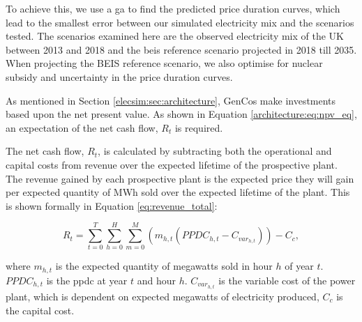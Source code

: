 To achieve this, we use a \acrfull{ga} to find the predicted price duration curves, which lead to the smallest error between our simulated electricity mix and the scenarios tested. The scenarios examined here are the observed electricity mix of the UK between 2013 and 2018 and the \acrfull{beis} reference scenario projected in 2018 till 2035. When projecting the BEIS reference scenario, we also optimise for nuclear subsidy and uncertainty in the price duration curves.






As mentioned in Section \ref{elecsim:sec:architecture}, GenCos make investments based upon the net present value. As shown in Equation \ref{architecture:eq:npv_eq}, an expectation of the net cash flow, $R_t$ is required. 

The net cash flow, $R_t$, is calculated by subtracting both the operational and capital costs from revenue over the expected lifetime of the prospective plant. The revenue gained by each prospective plant is the expected price they will gain per expected quantity of MWh sold over the expected lifetime of the plant. This is shown formally in Equation \ref{eq:revenue_total}:


\begin{equation}
\label{eq:revenue_total}
R_t = 
\sum\limits_{t=0}^T 
\sum\limits_{h=0}^H
\sum\limits_{m=0}^M \left(
m_{h,t}(PPDC_{h,t}
-
C_{var_{h,t}})\right)
- C_c,
\end{equation}

\noindent where $m_{h,t}$ is the expected quantity of megawatts sold in hour $h$ of year $t$. $PPDC_{h,t}$ is the \acrfull{ppdc} at year $t$ and hour $h$. $C_{var_{h,t}}$ is the variable cost of the power plant, which is dependent on expected megawatts of electricity produced, $C_c$ is the capital cost.

